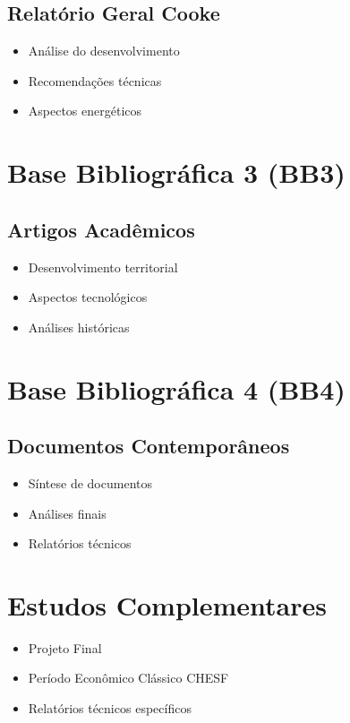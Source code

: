 \documentclass[12pt,a4paper]{report}
\begin{document}
\subsection{Relatório Geral Cooke}
\begin{itemize}[leftmargin=*]
    \item Análise do desenvolvimento
    \item Recomendações técnicas
    \item Aspectos energéticos
\end{itemize}

\section{Base Bibliográfica 3 (BB3)}
\subsection{Artigos Acadêmicos}
\begin{itemize}[leftmargin=*]
    \item Desenvolvimento territorial
    \item Aspectos tecnológicos
    \item Análises históricas
\end{itemize}

\section{Base Bibliográfica 4 (BB4)}
\subsection{Documentos Contemporâneos}
\begin{itemize}[leftmargin=*]
    \item Síntese de documentos
    \item Análises finais
    \item Relatórios técnicos
\end{itemize}

\section{Estudos Complementares}
\begin{itemize}[leftmargin=*]
    \item Projeto Final
    \item Período Econômico Clássico CHESF
    \item Relatórios técnicos específicos
\end{itemize}
\end{document}
